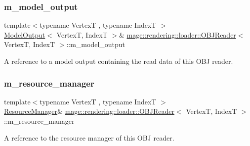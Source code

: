 \subsubsection{\texorpdfstring{m\+\_\+model\+\_\+output}{m\_model\_output}}
{\footnotesize\ttfamily template$<$typename VertexT , typename IndexT $>$ \\
\hyperlink{structmage_1_1rendering_1_1_model_output}{Model\+Output}$<$ VertexT, IndexT $>$\& \hyperlink{classmage_1_1rendering_1_1loader_1_1_o_b_j_reader}{mage\+::rendering\+::loader\+::\+O\+B\+J\+Reader}$<$ VertexT, IndexT $>$\+::m\+\_\+model\+\_\+output\hspace{0.3cm}{\ttfamily [private]}}

A reference to a model output containing the read data of this O\+BJ reader. \hypertarget{classmage_1_1rendering_1_1loader_1_1_o_b_j_reader_ae6208964e05f3e93eb9939942fe3b55c}{}\label{classmage_1_1rendering_1_1loader_1_1_o_b_j_reader_ae6208964e05f3e93eb9939942fe3b55c} 
\subsubsection{\texorpdfstring{m\+\_\+resource\+\_\+manager}{m\_resource\_manager}}
{\footnotesize\ttfamily template$<$typename VertexT , typename IndexT $>$ \\
\hyperlink{classmage_1_1rendering_1_1_resource_manager}{Resource\+Manager}\& \hyperlink{classmage_1_1rendering_1_1loader_1_1_o_b_j_reader}{mage\+::rendering\+::loader\+::\+O\+B\+J\+Reader}$<$ VertexT, IndexT $>$\+::m\+\_\+resource\+\_\+manager\hspace{0.3cm}{\ttfamily [private]}}

A reference to the resource manager of this O\+BJ reader. \hypertarget{classmage_1_1rendering_1_1loader_1_1_o_b_j_reader_a393e0932f169a786e38f120fc6f0d84b}{}\label{classmage_1_1rendering_1_1loader_1_1_o_b_j_reader_a393e0932f169a786e38f120fc6f0d84b} 
